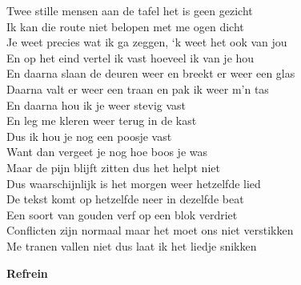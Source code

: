 Twee stille mensen aan de tafel het is geen gezicht\\
Ik kan die route niet belopen met me ogen dicht\\
Je weet precies wat ik ga zeggen, ‘k weet het ook van jou\\
En op het eind vertel ik vast hoeveel ik van je hou\\
En daarna slaan de deuren weer en breekt er weer een glas\\
Daarna valt er weer een traan en pak ik weer m’n tas\\
En daarna hou ik je weer stevig vast\\
En leg me kleren weer terug in de kast\\
Dus ik hou je nog een poosje vast\\
Want dan vergeet je nog hoe boos je was\\
Maar de pijn blijft zitten dus het helpt niet\\
Dus waarschijnlijk is het morgen weer hetzelfde lied\\
De tekst komt op hetzelfde neer in dezelfde beat\\
Een soort van gouden verf op een blok verdriet\\
Conflicten zijn normaal maar het moet ons niet verstikken\\
Me tranen vallen niet dus laat ik het liedje snikken

\textbf{Refrein}
